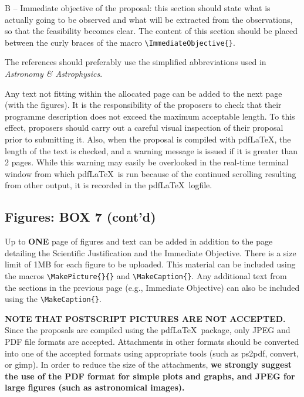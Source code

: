 \documentclass{article}
\begin{document}
B -- Immediate objective of the proposal: this section should state what
is actually going to be observed and what will be extracted from the
observations, so that the feasibility becomes clear.  The content of
this section should be placed between the curly braces of the
macro \verb|\ImmediateObjective{}|.

The references should preferably use the simplified abbreviations used 
in {\em Astronomy \& Astrophysics\/}.

\medskip

 Any text not fitting within the allocated page can be
added to the next page (with the figures). 
It is the responsibility of the proposers to check that their
programme description does not exceed the maximum acceptable
length. To this effect, proposers should carry out a careful visual
inspection of their proposal prior to submitting
it. Also, when the proposal is compiled with pdf\LaTeX, the length of
the text is checked, and a warning message is issued if it is greater
than 2 pages. While this warning may easily be overlooked in the
real-time terminal window from which pdf\LaTeX\ is run because of the
continued scrolling resulting from other output, it is recorded in the
pdf\LaTeX\ logfile. 


\subsection{Figures: {\bf BOX 7 (cont'd)}}

Up to {\bf ONE} page of figures and text can be added in addition to the 
page detailing the Scientific Justification and the Immediate Objective.
There is a size limit of 1MB for each figure to be uploaded.
This material can be included using the 
macros \verb|\MakePicture{}{}| and \verb|\MakeCaption{}|. Any
additional text from the sections in the previous page (e.g.,
Immediate Objective) can also be included using the 
\verb|\MakeCaption{}|.

{\bf NOTE THAT POSTSCRIPT PICTURES ARE NOT ACCEPTED.} Since the
proposals are compiled using the pdf\LaTeX\ package, only JPEG and PDF
file formats are accepted.  Attachments in other formats should be
converted into one of the accepted formats using appropriate tools
(such as ps2pdf, convert, or gimp).  In order to reduce the size of
the attachments, {\bf we strongly suggest the use of the PDF format for
simple plots and graphs, and JPEG for large figures (such as
astronomical images).} 
\end{document}

